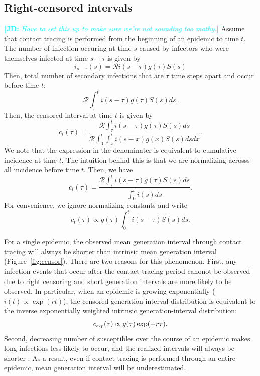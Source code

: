 \documentclass[12pt]{article}
\newcommand{\RR}{\ensuremath{{\mathcal R}}}
\newcommand{\tsub}[2]{#1_{{\textrm{\tiny #2}}}}
\newcommand{\comment}[3]{\textcolor{#1}{\textbf{[#2: }\textsl{#3}\textbf{]}}}
\newcommand{\jd}[1]{\comment{cyan}{JD}{#1}}
\begin{document}
\subsection*{Right-censored intervals}

\jd{Have to set this up to make sure we're not sounding too mathy.}
Assume that contact tracing is performed from the beginning of an epidemic to time $t$.
The number of infection occuring at time $s$ caused by infectors who were themselves infected at time $s-\tau$ is given by
\begin{equation}
i_{s-\tau}(s) = \RR i(s-\tau) g(\tau) S(s)
\end{equation}
Then, total number of secondary infections that are $\tau$ time steps apart and occur before time $t$:
\begin{equation}
\RR \int_\tau^t i(s-\tau) g(\tau) S(s) ds.
\end{equation}
Then, the censored interval at time $t$ is given by
\begin{equation}
c_t(\tau)= \frac{\RR \int_\tau^t i(s-\tau) g(\tau) S(s) ds}{\RR \int_0^t \int_x^t i(s-x) g(x) S(s) ds dx}.
\end{equation}
We note that the expression in the denominater is equivalent to cumulative incidence at time $t$.
The intuition behind this is that we are normalizing acrosss all incidence before time $t$.
Then, we have
\begin{equation}
c_t(\tau) = \frac{\RR \int_\tau^t i(s-\tau) g(\tau) S(s) ds}{\int_0^t i(s) ds}.
\end{equation}
For convenience, we ignore normalizing constants and write
\begin{equation}\label{eq:obsg}
c_t(\tau) \propto g(\tau) \int_{0}^t i(s-\tau) S(s) ds.
\end{equation}

For a single epidemic, the observed mean generation interval through contact tracing will always be shorter than intrinsic mean generation interval (Figure~\ref{fig:censor}).
There are two reasons for this phenomenon.
First, any infection events that occur after the contact tracing period canonot be observed due to right censoring and short generation intervals are more likely to be observed.
In particular, when an epidemic is growing exponentially ($i(t) \propto \exp(rt)$), 
the censored generation-interval distribution is equivalent to the inverse exponentially weighted intrinsic generation-interval distribution:
\begin{equation}
\tsub{c}{exp}(\tau) \propto g(\tau) \exp(-r\tau).
\label{eq:exp}
\end{equation}
Second, decreasing number of susceptibles over the course of an epidemic makes long infections less likely to occur, and the realized intervals will always be shorter \citep{champredon2015intrinsic}.
As a result, even if contact tracing is performed through an entire epidemic, mean generation interval will be underestimated.
\end{document}
